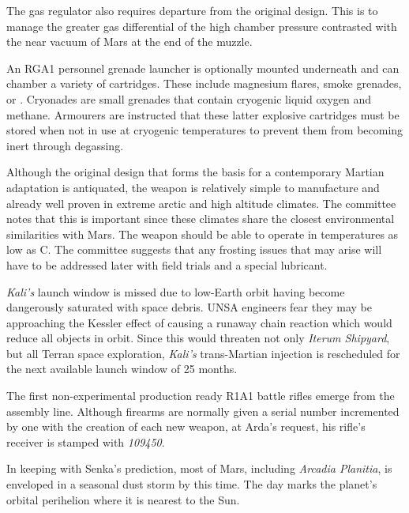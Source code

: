 The gas regulator also requires departure from the original design. This is to manage the greater gas differential of the high chamber pressure contrasted with the near vacuum of Mars at the end of the muzzle.

An RGA1 personnel grenade launcher is optionally mounted underneath and can chamber a variety of cartridges. These include magnesium flares, smoke grenades, or . Cryonades are small grenades that contain cryogenic liquid oxygen and methane. Armourers are instructed that these latter explosive cartridges must be stored when not in use at cryogenic temperatures to prevent them from becoming inert through degassing.

Although the original design that forms the basis for a contemporary Martian adaptation is antiquated, the weapon is relatively simple to manufacture and already well proven in extreme arctic and high altitude climates. The committee notes that this is important since these climates share the closest environmental similarities with Mars. The weapon should be able to operate in temperatures as low as C. The committee suggests that any frosting issues that may arise will have to be addressed later with field trials and a special lubricant.
\StopTimelineDate

{\it Kali's} launch window is missed due to low-Earth orbit having become dangerously saturated with space debris. UNSA engineers fear they may be approaching the Kessler effect of causing a runaway chain reaction which would reduce all objects in orbit. Since this would threaten not only {\it Iterum Shipyard}, but all Terran space exploration, {\it Kali's} trans-Martian injection is rescheduled for the next available launch window of 25 months.
\StopTimelineDate

The first non-experimental production ready R1A1 battle rifles emerge from the assembly line. Although firearms are normally given a serial number incremented by one with the creation of each new weapon, at Arda's request, his rifle's receiver is stamped with {\it 109450}.
\StopTimelineDate

In keeping with Senka's prediction, most of Mars, including {\it Arcadia Planitia}, is enveloped in a seasonal dust storm by this time. The day marks the planet's orbital perihelion where it is nearest to the Sun.
\StopTimelineDate

